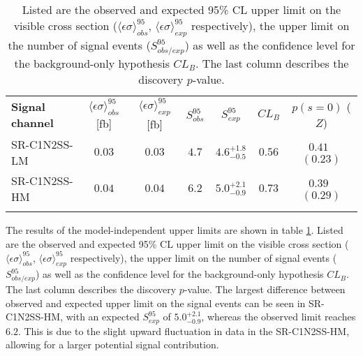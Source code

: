 \begin{table}[htpb!]
\centering
\setlength{\tabcolsep}{0.0pc}
\begin{tabular*}{\textwidth}{@{\extracolsep{\fill}}lcccccc}
\noalign{\smallskip}\hline\noalign{\smallskip}
{\textbf{Signal channel}}                        & $\langle\epsilon{ \sigma}\rangle_{ obs}^{95}$[fb]  & $\langle\epsilon{ \sigma}\rangle_{ exp}^{95}$[fb] &  $S_{ obs}^{95}$  & $S_{ exp}^{95}$ & $CL_{B}$ & $p(s=0)$ ($Z$)  \\
\noalign{\smallskip}\hline\noalign{\smallskip}
 SR-C1N2SS-LM    & $0.03$ &  $0.03$ & $4.7$ & $ { 4.6 }^{ +1.8 }_{ -0.5 }$ & $0.56$ & $ 0.41$~$(0.23)$ \\%
 SR-C1N2SS-HM  & $0.04$ &  $0.04$ & $6.2$ & $ { 5.0 }^{ +2.1 }_{ -0.9 }$ & $0.73$ & $ 0.39$~$(0.29)$ \\%
\noalign{\smallskip}\hline\noalign{\smallskip}
\end{tabular*}
\caption[Breakdown of upper limits.]{
Listed are the observed and expected 95\% CL upper limit on the visible cross section ($\langle\epsilon\sigma\rangle_{ obs}^{95}$, $\langle\epsilon\sigma\rangle_{ exp}^{95}$ respectively),  the upper limit on the number of signal events
($S_{ obs/exp}^{95}$) as well as the confidence level for the background-only hypothesis $CL_B$.  The last column describes the discovery $p$-value. 
\label{tab:analysis:upperlimit}}
\end{table}

The results of the model-independent upper limits are shown in table \ref{tab:analysis:upperlimit}.  Listed are the observed and expected 95\% CL upper limit on the visible cross section ($\langle\epsilon\sigma\rangle_{ obs}^{95}$, $\langle\epsilon\sigma\rangle_{ exp}^{95}$ respectively),  the upper limit on the number of signal events
($S_{ obs/exp}^{95}$) as well as the confidence level for the background-only hypothesis $CL_B$.  The last column describes the discovery $p$-value. 
The largest difference between observed and expected upper limit on the signal events can be seen in SR-C1N2SS-HM, with an expected $S_{ exp}^{95}$ of $5.0^{+ 2.1}_ {-0.9}$,  whereas the observed limit reaches $6.2$.  This is due to the slight upward fluctuation in data in the SR-C1N2SS-HM,  allowing for a larger potential signal contribution. 

